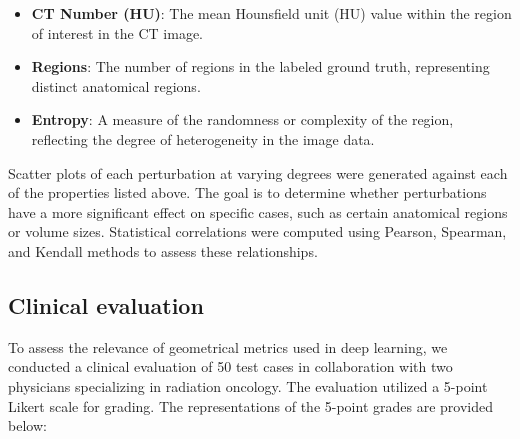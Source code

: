 \begin{itemize}
    \item \textbf{CT Number (HU)}: The mean Hounsfield unit (HU) value within the region of interest in the CT image.
    \item \textbf{Regions}: The number of regions in the labeled ground truth, representing distinct anatomical regions.
    \item \textbf{Entropy}: A measure of the randomness or complexity of the region, reflecting the degree of heterogeneity in the image data.
\end{itemize}

Scatter plots of each perturbation at varying degrees were generated against each of the properties listed above. 
The goal is to determine whether perturbations have a more significant effect on specific cases, such as certain anatomical 
regions or volume sizes. Statistical correlations were computed using Pearson, Spearman, and Kendall methods to assess 
these relationships.

\newpage
\subsection{Clinical evaluation}
To assess the relevance of geometrical metrics used in deep learning, we conducted a clinical evaluation of 50 test cases in collaboration with two 
physicians specializing in radiation oncology. The evaluation utilized a 5-point Likert scale for grading. 
The representations of the 5-point grades are provided below:

